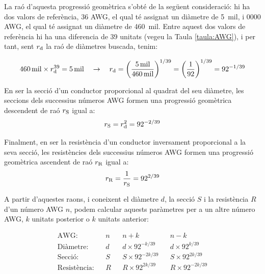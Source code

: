 La ra\'{o} d'aquesta progressi\'{o} geom\`{e}trica s'obt\'{e} de la seg\"{u}ent consideraci\'{o}: hi ha dos valors de refer\`{e}ncia, 36 AWG, el qual t\'{e} assignat un di\`{a}metre de \SI{5}{mil}, i 0000 AWG, el qual t\'{e} assignat un di\`{a}metre de \SI{460}{mil}. Entre aquest dos valors de refer\`{e}ncia hi ha una diferencia de 39 unitats (vegeu la Taula \vref{taula:AWG}), i per tant, sent $r_\mathrm{d}$ la ra\'{o} de di\`{a}metres buscada, tenim:

\begin{equation}
   \SI{460}{mil} \times r_\mathrm{d}^{39} = \SI{5}{mil} \quad \rightarrow \quad r_\mathrm{d} = \left( \frac{\SI{5}{mil}}{\SI{460}{mil}} \right)^{1/39} = \left( \frac{1}{92} \right)^{1/39} = 92^{-1/39}
\end{equation}

En ser la secci\'{o} d'un conductor proporcional al quadrat del seu di\`{a}metre, les seccions dels successius n\'{u}meros AWG formen una progressi\'{o} geom\`{e}trica  descendent de ra\'{o} $r_\mathrm{S}$ igual a: \begin{equation}
   r_\mathrm{S} = r_\mathrm{d}^2 = 92^{-2/39}
\end{equation}

Finalment, en ser la resist\`{e}ncia d'un conductor inversament proporcional a la seva secci\'{o}, les resist\`{e}ncies dels successius n\'{u}meros AWG formen una progressi\'{o} geom\`{e}trica ascendent de ra\'{o} $r_\mathrm{R}$ igual a:
\begin{equation}
   r_\mathrm{R} = \frac{1}{r_\mathrm{S}} = 92^{2/39}
\end{equation}

A partir d'aquestes raons, i coneixent el di\`{a}metre $d$, la secci\'{o} $S$ i la resist\`{e}ncia $R$ d'un n\'{u}mero AWG $n$, podem calcular aquests par\`{a}metres per a un altre n\'{u}mero AWG, $k$ unitats posterior o $k$ unitats anterior:

\begin{equation}
   \begin{array}{rllllll}
     \text{AWG:}         & & n & & n+k                & & n-k \\
     \text{Di\`{a}metre:}    & & d & & d\times 92^{-k/39}  & & d\times 92^{k/39} \\
     \text{Secci\'{o}:}      & & S & & S\times 92^{-2k/39} & & S\times 92^{2k/39} \\
     \text{Resist\`{e}ncia:} & & R & & R\times 92^{2k/39}  & & R\times 92^{-2k/39}
   \end{array}
\end{equation}

